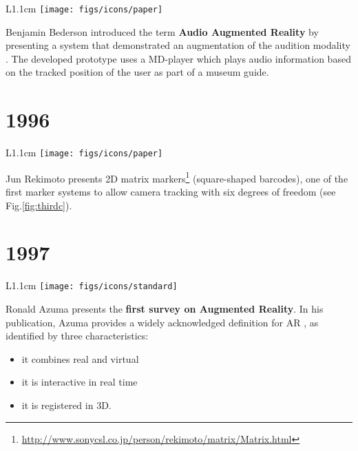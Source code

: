 \documentclass[12pt,a4paper]{article}
\begin{document}
\vspace{0.1in}

\begin{wrapfigure}{L}{1.1cm}
	\vspace{-10pt}
	\texttt{[image: figs/icons/paper]}
	\vspace{-10pt}		
\end{wrapfigure}
\noindent Benjamin Bederson introduced the term \textbf{Audio Augmented Reality} by presenting a system that demonstrated an augmentation of the audition modality \cite{Bederson95}. The developed prototype uses a MD-player which plays audio information based on the tracked position of the user as part of a museum guide.

 \vspace{-5pt}
\section*{1996}
\begin{wrapfigure}{L}{1.1cm}
	\vspace{-10pt}
	\texttt{[image: figs/icons/paper]}
	\vspace{-10pt}		
\end{wrapfigure}
Jun Rekimoto presents 2D matrix markers\footnote{\url{http://www.sonycsl.co.jp/person/rekimoto/matrix/Matrix.html}} (square-shaped barcodes), one of the first marker systems to allow camera tracking with six degrees of freedom \cite{Rekimoto96} (see Fig.\ref{fig:thirdc}).

\section*{1997}
\begin{wrapfigure}{L}{1.1cm}
	\vspace{-10pt}	
	\texttt{[image: figs/icons/standard]}
	\vspace{-10pt}		
\end{wrapfigure}
Ronald Azuma presents the \textbf{first survey on Augmented Reality}. In his publication, Azuma provides a widely acknowledged definition for AR \cite{Azuma97}, as identified by three characteristics:

\begin{itemize}
\item it combines real and virtual
\item it is interactive in real time
\item it is registered in 3D.
\end{itemize}
\vspace{0.1in} 
\end{document}
